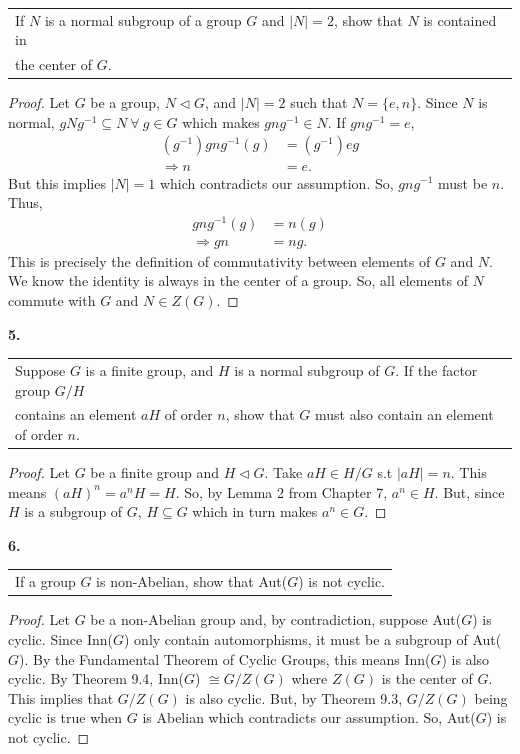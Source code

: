 \documentclass[12pt, letterpaper]{article}
\begin{document}
 \begin{tabular} [t]{l}
     If $N$ is a normal subgroup of a group $G$ and $|N| = 2$, show that $N$ is contained in \\
     the center of $G$.
\end{tabular}
\begin{proof}
    Let $G$ be a group, $N \lhd G$, and $|N| = 2$ such that $N = \{e , n\}.$ Since $N$ is normal, $gNg^{-1} \subseteq N \ \forall \ g \in G$ which makes $gng^{-1} \in N$. If $gng^{-1} = e$, 
    \begin{align*}
        (g^{-1})gng^{-1}(g) &= (g^{-1})eg \\
        \Rightarrow n &= e.
    \end{align*}
    But this implies $|N| = 1$ which contradicts our assumption. So, $gng^{-1}$ must be $n$. Thus,
    \begin{align*}
        gng^{-1}(g) &= n(g)\\
        \Rightarrow gn &= ng.
    \end{align*}
    This is precisely the definition of commutativity between elements of $G$ and $N$. We know the identity is always in the center of a group. So, all elements of $N$ commute with $G$ and $N \in Z(G)$.
\end{proof} \vspace{0.2em}
\noindent \textbf{5.} \begin{tabular}[t]{l}
     Suppose $G$ is a finite group, and $H$ is a normal subgroup of $G$. If the factor group $G/H$ \\
     contains an element $aH$ of order $n$, show that $G$ must also contain an element of order $n$.
\end{tabular}
\begin{proof}
    Let $G$ be a finite group and $H \lhd G$. Take $aH \in H/G$ s.t $|aH| = n$. This means $(aH)^{n} = a^{n}H = H$. So, by Lemma 2 from Chapter 7, $a^n \in H$. But, since $H$ is a subgroup of $G$, $H \subseteq G$ which in turn makes $a^n \in G$.  
\end{proof} \vspace{0.2em}
\noindent \textbf{6.} \begin{tabular}[t]{l}
     If a group $G$ is non-Abelian, show that Aut($G$) is not cyclic.
\end{tabular}
\begin{proof}
    Let $G$ be a non-Abelian group and, by contradiction, suppose Aut($G$) is cyclic. Since Inn($G$) only contain automorphisms, it must be a subgroup of Aut($G$). By the Fundamental Theorem of Cyclic Groups, this means Inn($G$) is also cyclic. By Theorem 9.4, Inn($G$) $\cong G/Z(G)$ where $Z(G)$ is the center of $G$. This implies that $G/Z(G)$ is also cyclic. But, by Theorem 9.3,  $G/Z(G)$ being cyclic is true when $G$ is Abelian which contradicts our assumption. So, Aut($G$) is not cyclic.
\end{proof}
\end{document}
